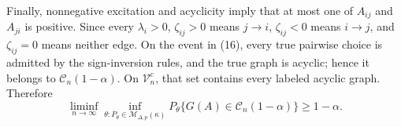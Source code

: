 Finally, nonnegative excitation and acyclicity imply that at most one of \(A_{ij}\) and \(A_{ji}\) is positive.  Since every \(\lambda_i>0\), \(\zeta_{ij}>0\) means \(j\to i\), \(\zeta_{ij}<0\) means \(i\to j\), and \(\zeta_{ij}=0\) means neither edge.  On the event in (16), every true pairwise choice is admitted by the sign-inversion rules, and the true graph is acyclic; hence it belongs to \(\mathcal C_n(1-\alpha)\).  On \(\mathcal V_n^c\), that set contains every labeled acyclic graph.  Therefore
\[
 \liminf_{n\to\infty}\inf_{\theta:P_\theta\in\mathcal M_{\Delta,p}(\kappa)}
 P_\theta\{G(A)\in\mathcal C_n(1-\alpha)\}\geq1-\alpha.
\]